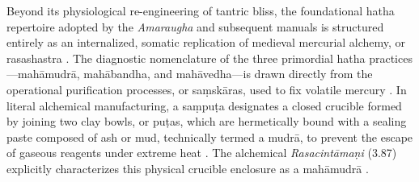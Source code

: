 \documentclass[11pt,twoside,letterpaper]{article}
\begin{document}
Beyond its physiological re-engineering of tantric bliss, the foundational hatha repertoire adopted by the \textit{Amaraugha} and subsequent manuals is structured entirely as an internalized, somatic replication of medieval mercurial alchemy, or rasashastra \citep{Mallinson2021}. The diagnostic nomenclature of the three primordial hatha practices—mahāmudrā, mahābandha, and mahāvedha—is drawn directly from the operational purification processes, or saṃskāras, used to fix volatile mercury \citep{Mallinson2021}. In literal alchemical manufacturing, a saṃpuṭa designates a closed crucible formed by joining two clay bowls, or puṭas, which are hermetically bound with a sealing paste composed of ash or mud, technically termed a mudrā, to prevent the escape of gaseous reagents under extreme heat \citep{Mallinson2021}. The alchemical \textit{Rasacintāmaṇi} (3.87) explicitly characterizes this physical crucible enclosure as a mahāmudrā \citep{Mallinson2021}.
\end{document}
